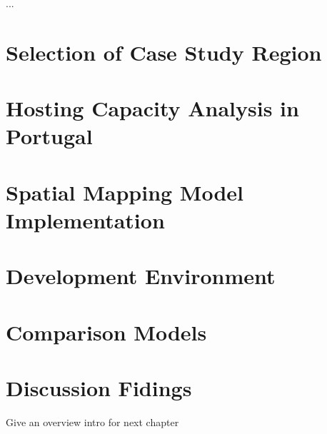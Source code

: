 \cleardoublepage
\label{chap:4analysis}

...


\section{Selection of Case Study Region}




\section{Hosting Capacity Analysis in Portugal}




\section{Spatial Mapping Model Implementation}




\section{Development Environment}




\section{Comparison Models}




\section{Discussion Fidings}

Give an overview intro for next chapter